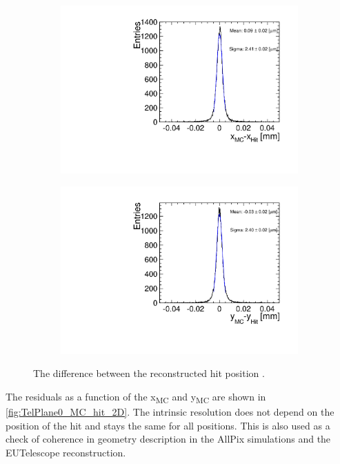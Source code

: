 \begin{figure}[htbp] \centering
  \begin{subfigure}[b]{0.45\textwidth}
    \includegraphics[width=\textwidth]{figures/Telescope/telescopePlane0_MC_vs_hit_x.pdf}
    \caption{}
  \end{subfigure}\hfill
  \begin{subfigure}[b]{0.45\textwidth}
    \includegraphics[width=\textwidth]{figures/Telescope/telescopePlane0_MC_vs_hit_y.pdf}
    \caption{}
  \end{subfigure}
  \caption{The difference between the reconstructed hit position .}
  \label{fig:TelPlane0_MC_hit}
\end{figure}

The residuals as a function of the x\textsubscript{MC} and
y\textsubscript{MC} are shown in \cref{fig:TelPlane0_MC_hit_2D}. The
intrinsic resolution does not depend on the position of the hit and
stays the same for all positions. This is also used as a check of
coherence in geometry description in the AllPix simulations and the
EUTelescope reconstruction.

